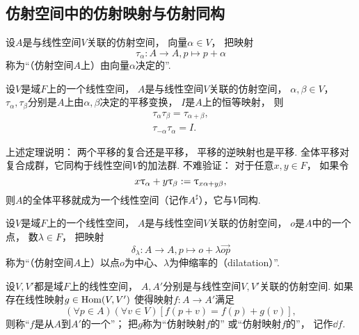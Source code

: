 \subsection{仿射空间中的仿射映射与仿射同构}
\begin{definition}
设\(A\)是与线性空间\(V\)关联的仿射空间，
向量\(\alpha \in V\)，
把映射\begin{equation*}
	\tau_\alpha\colon A \to A,
	p \mapsto p + \alpha
\end{equation*}
称为“（仿射空间\(A\)上）由向量\(\alpha\)决定的”.
\end{definition}

\begin{theorem}
设\(V\)是域\(F\)上的一个线性空间，
\(A\)是与线性空间\(V\)关联的仿射空间，
\(\alpha,\beta \in V\)，
\(\tau_\alpha,\tau_\beta\)分别是\(A\)上由\(\alpha,\beta\)决定的平移变换，
\(I\)是\(A\)上的恒等映射，
则\begin{gather*}
	\tau_\alpha \tau_\beta = \tau_{\alpha + \beta}, \\
	\tau_{-\alpha} \tau_\alpha = I.
\end{gather*}
\end{theorem}
\begin{remark}
上述定理说明：
两个平移的复合还是平移，
平移的逆映射也是平移.
全体平移对复合成群，它同构于线性空间\(V\)的加法群.
不难验证：
对于任意\(x,y \in F\)，
如果令\begin{equation*}
	x \uptau_\alpha + y \uptau_\beta
	:= \uptau_{x \alpha + y \beta},
\end{equation*}
则\(A\)的全体平移就成为一个线性空间（记作\(A^\sharp\)），它与\(V\)同构.
\end{remark}

\begin{definition}
设\(V\)是域\(F\)上的一个线性空间，
\(A\)是与线性空间\(V\)关联的仿射空间，
\(o\)是\(A\)中的一个点，
数\(\lambda \in F\)，
把映射\begin{equation*}
	\delta_\lambda\colon A \to A,
	p \mapsto o + \lambda\vec{op}
\end{equation*}
称为“（仿射空间\(A\)上）以点\(o\)为中心、\(\lambda\)为伸缩率的（dilatation）”.
\end{definition}

\begin{definition}
设\(V,V'\)都是域\(F\)上的线性空间，
\(A,A'\)分别是与线性空间\(V,V'\)关联的仿射空间.
如果存在线性映射\(g \in \operatorname{Hom}(V,V')\)
使得映射\(f\colon A \to A'\)满足\begin{equation*}
	(\forall p \in A)
	(\forall v \in V)
	[
		f(p + v)
		= f(p) + g(v)
	],
\end{equation*}
则称“\(f\)是从\(A\)到\(A'\)的一个”；
把\(g\)称为“仿射映射\(f\)的”
或“仿射映射\(f\)的”，
记作\(\dd{f}\).
\end{definition}

